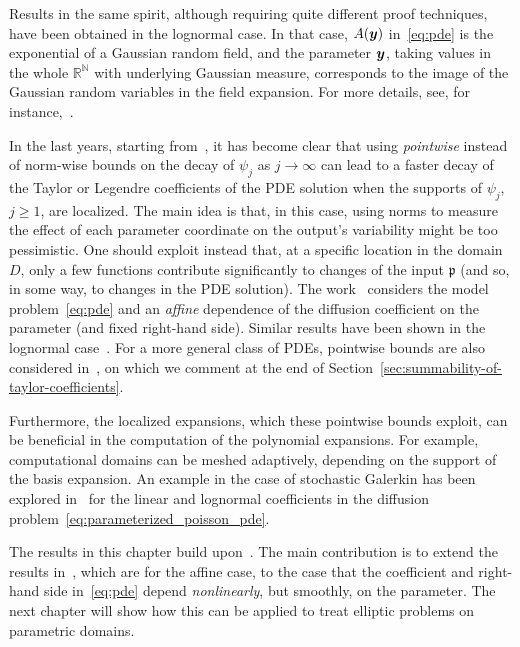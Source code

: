 Results in the same spirit, although requiring quite different proof techniques, have been obtained in the lognormal case.
In that case, $A({\bm{y}})$ in~\eqref{eq:pde} is the exponential of a Gaussian random field, and the parameter ${\bm{y}}$, taking values in the whole $\mathbb{R}^{\mathbb{N}}$ with underlying Gaussian measure, corresponds to the image of the Gaussian random variables in the field expansion.
For more details, see, for instance,~\cite{ernst2018,hoang2014}.

In the last years, starting from~\cite{bachmayr2017a}, it has become clear that using \textsl{pointwise} instead of norm-wise bounds on the decay of $\psi_j$ as $j\rightarrow\infty$ can lead to a faster decay of the Taylor or Legendre coefficients of the PDE solution when the supports of $\psi_j$, $j\geq 1$, are localized.
The main idea is that, in this case, using norms to measure the effect of each parameter coordinate on the output's variability might be too pessimistic.
One should exploit instead that, at a specific location in the domain $D$, only a few functions contribute significantly to changes of the input $\mathfrak{p}$ (and so, in some way, to changes in the PDE solution).
The work~\cite{bachmayr2017a} considers the model problem~\eqref{eq:pde} and an \textsl{affine} dependence of the diffusion coefficient on the parameter (and fixed right-hand side).
Similar results have been shown in the lognormal case~\cite{bachmayr2017,dung2022}.
For a more general class of PDEs, pointwise bounds are also considered in~\cite{zech2018}, on which we comment at the end of Section~\ref{sec:summability-of-taylor-coefficients}.

Furthermore, the localized expansions, which these pointwise bounds exploit, can be beneficial in the computation of the polynomial expansions.
For example, computational domains can be meshed adaptively, depending on the support of the basis expansion.
An example in the case of stochastic Galerkin has been explored in~\cite{bachmayr2025} for the linear and lognormal coefficients in the diffusion problem~\eqref{eq:parameterized_poisson_pde}.

The results in this chapter build upon~\cite{bachmayr2017,bachmayr2017a}.
The main contribution is to extend the results in~\cite{bachmayr2017a}, which are for the affine case, to the case that the coefficient and right-hand side in~\eqref{eq:pde} depend \textsl{nonlinearly}, but smoothly, on the parameter.
The next chapter will show how this can be applied to treat elliptic problems on parametric domains.